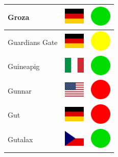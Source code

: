 \documentclass[12pt, a4paper, twoside]{report}
\begin{document}
\begin{center}
\begin{longtable}{|p{5cm}|p{2cm}|p{2cm}|}
Groza & \includegraphics[width=1cm]{4x3/de} & \includegraphics[width=1cm]{likes/y} \\ \hline
Guardians Gate & \includegraphics[width=1cm]{4x3/de} & \includegraphics[width=1cm]{likes/m} \\ \hline
Guineapig & \includegraphics[width=1cm]{4x3/it} & \includegraphics[width=1cm]{likes/y} \\ \hline
Gunnar & \includegraphics[width=1cm]{4x3/us} & \includegraphics[width=1cm]{likes/n} \\ \hline
Gut & \includegraphics[width=1cm]{4x3/de} & \includegraphics[width=1cm]{likes/n} \\ \hline
Gutalax & \includegraphics[width=1cm]{4x3/cz} & \includegraphics[width=1cm]{likes/y} \\ \hline

\end{longtable}
\end{center}
\end{document}
